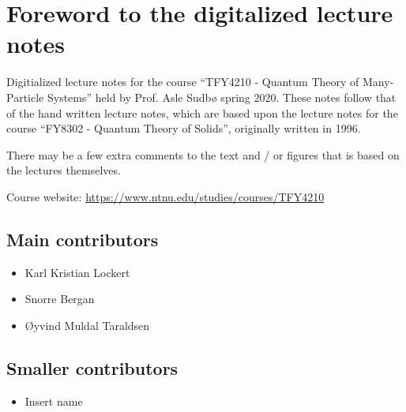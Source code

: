 \section*{Foreword to the digitalized lecture notes}

Digitialized lecture notes for the course ``TFY4210 - Quantum Theory of Many-Particle Systems'' held by Prof. Asle Sudbø spring 2020. These notes follow that of the hand written lecture notes, which are based upon the lecture notes for the course ``FY8302 - Quantum Theory of Solids'', originally written in 1996. 

There may be a few extra comments to the text and / or figures that is based on the lectures themselves. 


Course website: \href{https://www.ntnu.edu/studies/courses/TFY4210}{https://www.ntnu.edu/studies/courses/TFY4210}



\subsection*{Main contributors}
	\begin{multicols}{2}
\begin{itemize} 
	\item Karl Kristian Lockert
	\item Snorre Bergan
	\item Øyvind Muldal Taraldsen
\end{itemize}
\end{multicols}

\subsection*{Smaller contributors}
\begin{multicols}{2}
\begin{itemize}
	\item {\color{red} Insert name}
\end{itemize}
\end{multicols}

